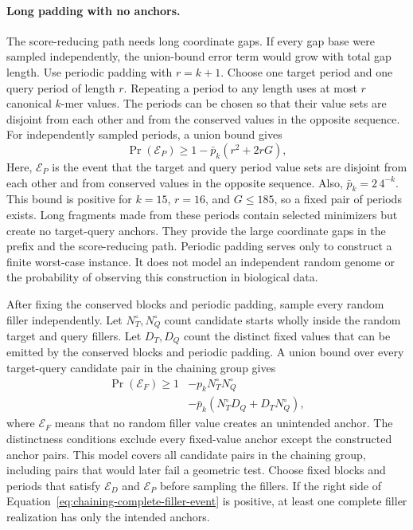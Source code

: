 \paragraph{Long padding with no anchors.}
The score-reducing path needs long coordinate gaps. If every gap base were
sampled independently, the union-bound error term would grow with total gap
length. Use periodic padding with \(r=k+1\). Choose one target period and one
query period of length \(r\). Repeating a period to any length uses at most \(r\) canonical
\(k\)-mer values. The periods can be chosen so that their value sets are
disjoint from each other and from the conserved values in the opposite
sequence. For independently sampled periods, a union bound gives
\begin{equation}
  \Pr(\mathcal E_P)\geq
  1-\bar p_k\left(r^2+2rG\right),
  \label{eq:chaining-periodic-padding-existence}
\end{equation}
Here, \(\mathcal E_P\) is the event that the target and query period value
sets are disjoint from each other and from conserved values in the opposite
sequence. Also, \(\bar p_k=2\,4^{-k}\). This bound is positive for \(k=15\),
\(r=16\), and \(G\leq185\), so a fixed pair of periods exists. Long fragments
made from these periods contain selected minimizers but create no target-query
anchors. They provide the large coordinate gaps in the prefix and the
score-reducing path.
Periodic padding serves only to construct a finite worst-case instance. It
does not model an independent random genome or the probability of observing
this construction in biological data.

After fixing the conserved blocks and periodic padding, sample every random
filler independently. Let
\(N_T^\circ,N_Q^\circ\) count candidate starts wholly inside the random
target and query fillers. Let \(D_T,D_Q\) count the distinct fixed values
that can be emitted by the conserved blocks and periodic padding. A union
bound over every
target-query candidate pair in the chaining group gives
\begin{equation}
\begin{aligned}
  \Pr(\mathcal E_F)\geq 1
  &-p_kN_T^\circ N_Q^\circ\\
  &-\bar p_k\!\left(N_T^\circ D_Q+D_TN_Q^\circ\right),
\end{aligned}
\label{eq:chaining-complete-filler-event}
\end{equation}
where \(\mathcal E_F\) means that no random filler value creates an unintended
anchor. The distinctness conditions exclude every fixed-value anchor except
the constructed anchor pairs. This model covers all candidate pairs in the chaining group, including pairs that
would later fail a geometric test.
Choose fixed blocks and periods that satisfy \(\mathcal E_D\) and
\(\mathcal E_P\) before sampling the fillers. If the right side of
Equation~\ref{eq:chaining-complete-filler-event} is positive, at least one
complete filler realization has only the intended anchors.

